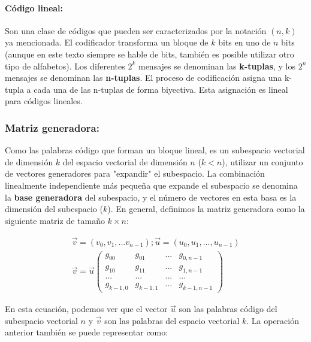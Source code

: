 \documentclass{article}
\begin{document}
\paragraph{Código lineal:} Son una clase de códigos que pueden ser caracterizados por la notación $(n,k)$ ya mencionada. El codificador transforma un bloque de $k$ bits en uno de $n$ bits (aunque en este texto siempre se hable de bits, también es posible utilizar otro tipo de alfabetos). Los diferentes $2^k$ mensajes se denominan las \textbf{k-tuplas}, y los $2^n$ mensajes se denominan las \textbf{n-tuplas}. El proceso de codificación asigna una k-tupla a cada una de las n-tuplas de forma biyectiva. Esta asignación es lineal para códigos lineales.

\pagebreak

\subsubsection{Matriz generadora:} 

Como las palabras código que forman un bloque lineal, es un subespacio vectorial de dimensión $k$ del espacio vectorial de dimensión $n$ ($k<n$), utilizar un conjunto de vectores generadores para "expandir" el subespacio. La combinación linealmente independiente más pequeña que expande el subespacio se denomina la \textbf{base generadora} del subespacio, y el número de vectores en esta basa es la dimensión del subespacio ($k$). En general, definimos la matriz generadora como la siguiente matriz de tamaño $k \times n$:

\begin{equation}
    \begin{split}
        \vec{v} = (v_0, v_1, ... v_{n-1}); \vec{u} = (u_0, u_1, ..., u_{n-1}) \\
       \vec{v}=\vec{u}
       \begin{pmatrix}
            g_{00} & g_{01} & ... & g_{0,n-1} \\
            g_{10} & g_{11} & ... & g_{1,n-1} \\
            ... & ... & ... & ... \\
            g_{k-1,0} & g_{k-1, 1} & ... & g_{k-1, n-1}
       \end{pmatrix} 
    \end{split}
\end{equation}

En esta ecuación, podemos ver que el vector $\vec{u}$ son las palabras código del subespacio vectorial $n$ y $\vec{v}$ son las palabras del espacio vectorial $k$. La operación anterior también se puede representar como:
\end{document}

